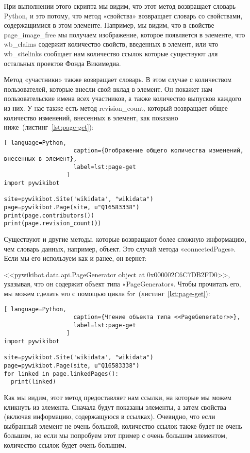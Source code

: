 При выполнении этого скрипта мы видим, что этот метод возвращает словарь Python, и это потому, что метод «свойства» возвращает словарь со свойствами, содержащимися в этом элементе. Например, мы видим, что в свойстве page\_image\_free мы получаем изображение, которое появляется в элементе, что wb\_claims содержит количество свойств, введенных в элемент, или что wb\_sitelinks сообщает нам количество ссылок которые существуют для остальных проектов Фонда Викимедиа.

Метод «участники» также возвращает словарь. В этом случае с количеством пользователей, которые внесли свой вклад в элемент. Он покажет нам пользовательские имена всех участников, а также количество выпусков каждого из них. У нас также есть метод revision\_count, который возвращает общее количество изменений, внесенных в элемент, как показано ниже~(листинг~\ref{lst:page-get}):

\begin{lstlisting}[ language=Python,
                    caption={Отображение общего количества изменений, внесенных в элемент},
                    label=lst:page-get
                  ]
import pywikibot

site=pywikibot.Site('wikidata', "wikidata")
page=pywikibot.Page(site, u"Q16583338")
print(page.contributors())
print(page.revision_count())
\end{lstlisting}

Существуют и другие методы, которые возвращают более сложную информацию, чем словарь данных, например, объект. Это случай метода «connectedPages». Если мы его используем как и ранее, он вернет: 

<<pywikibot.data.api.PageGenerator object at 0x000002C6C7DB2FD0>>, 
указывая, что он содержит объект типа «PageGenerator». Чтобы прочитать его, мы можем сделать это с помощью цикла for~(листинг~\ref{lst:page-get}):

\begin{lstlisting}[ language=Python,
                    caption={Чтение объекта типа <<PageGenerator>>},
                    label=lst:page-get
                  ]
import pywikibot

site=pywikibot.Site('wikidata', "wikidata")
page=pywikibot.Page(site, u"Q16583338")
for linked in page.linkedPages():
  print(linked)
\end{lstlisting}

Как мы видим, этот метод предоставляет нам ссылки, на которые мы можем кликнуть из элемента. Сначала будут показаны элементы, а затем свойства (включая информацию, содержащуюся в ссылках). Очевидно, что если выбранный элемент не очень большой, количество ссылок также будет не очень большим, но если мы попробуем этот пример с очень большим элементом, количество ссылок будет очень большим.

